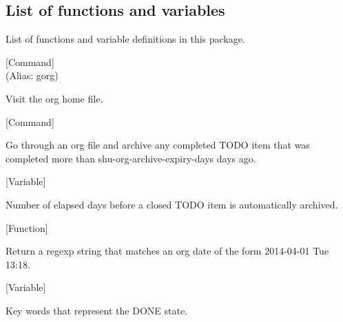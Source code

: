\subsection{List of functions and variables}

List of functions and variable definitions in this package.



\vspace{1em}
\noindent
{}
\usebox{\funcname}
 \hfill [Command]\\%
 (Alias: gorg)

\begin{doc-string}
Visit the org home file.
\end{doc-string}

\vspace{1em}
\noindent
{}
\usebox{\funcname}
 \hfill [Command]

\begin{doc-string}
Go through an org file and archive any completed TODO item that was completed more
than shu-org-archive-expiry-days days ago.
\end{doc-string}

\vspace{1em}
\noindent
{}
\usebox{\funcname}
 \hfill [Variable]

\begin{doc-string}
Number of elapsed days before a closed TODO item is automatically archived.
\end{doc-string}

\vspace{1em}
\noindent
{}
\usebox{\funcname}
 \hfill [Function]

\begin{doc-string}
Return a regexp string that matches an org date of the form 2014-04-01 Tue 13:18.
\end{doc-string}

\vspace{1em}
\noindent
{}
\usebox{\funcname}
 \hfill [Variable]

\begin{doc-string}
Key words that represent the DONE state.
\end{doc-string}


